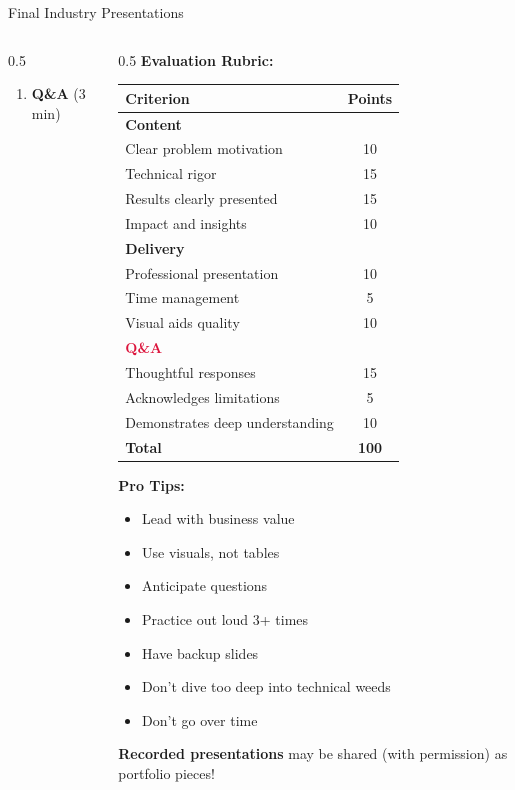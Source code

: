 \begin{frame}{Final Industry Presentations}
\begin{columns}
\begin{column}{0.5\textwidth}
\begin{enumerate}
\item \textbf{Q\&A} (3 min)
\end{enumerate}
\end{column}

\begin{column}{0.5\textwidth}
\textbf{Evaluation Rubric:}

\begin{table}
\tiny
\begin{tabular}{|l|c|}
\hline
\rowcolor{navyblue!20}
\textbf{Criterion} & \textbf{Points} \\
\hline
\textcolor{forest}{\textbf{Content}} & \\
\hline
Clear problem motivation & 10 \\
Technical rigor & 15 \\
Results clearly presented & 15 \\
Impact and insights & 10 \\
\hline
\textcolor{navyblue}{\textbf{Delivery}} & \\
\hline
Professional presentation & 10 \\
Time management & 5 \\
Visual aids quality & 10 \\
\hline
\textcolor{crimson}{\textbf{Q\&A}} & \\
\hline
Thoughtful responses & 15 \\
Acknowledges limitations & 5 \\
Demonstrates deep understanding & 10 \\
\hline
\textbf{Total} & \textbf{100} \\
\hline
\end{tabular}
\end{table}

\vspace{0.2cm}

\textbf{Pro Tips:}
\begin{itemize}
\item[$\checkmark$] Lead with business value
\item[$\checkmark$] Use visuals, not tables
\item[$\checkmark$] Anticipate questions
\item[$\checkmark$] Practice out loud 3+ times
\item[$\checkmark$] Have backup slides
\item[$\times$] Don't dive too deep into technical weeds
\item[$\times$] Don't go over time
\end{itemize}

\vspace{0.2cm}

\textbf{Recorded presentations} may be shared (with permission) as portfolio pieces!
\end{column}
\end{columns}
\end{frame}

